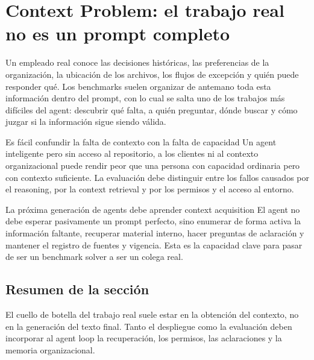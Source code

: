 \section{Context Problem: el trabajo real no es un prompt completo}



Un empleado real conoce las decisiones históricas, las preferencias de la organización, la ubicación de los archivos, los flujos de excepción y quién puede responder qué. Los benchmarks suelen organizar de antemano toda esta información dentro del prompt, con lo cual se salta uno de los trabajos más difíciles del agent: descubrir qué falta, a quién preguntar, dónde buscar y cómo juzgar si la información sigue siendo válida.

\begin{warningbox}{Es fácil confundir la falta de contexto con la falta de capacidad}
Un agent inteligente pero sin acceso al repositorio, a los clientes ni al contexto organizacional puede rendir peor que una persona con capacidad ordinaria pero con contexto suficiente. La evaluación debe distinguir entre los fallos causados por el reasoning, por la context retrieval y por los permisos y el acceso al entorno.
\end{warningbox}

\begin{importantbox}{La próxima generación de agents debe aprender context acquisition}
El agent no debe esperar pasivamente un prompt perfecto, sino enumerar de forma activa la información faltante, recuperar material interno, hacer preguntas de aclaración y mantener el registro de fuentes y vigencia. Esta es la capacidad clave para pasar de ser un benchmark solver a ser un colega real.
\end{importantbox}


\subsection{Resumen de la sección}

El cuello de botella del trabajo real suele estar en la obtención del contexto, no en la generación del texto final. Tanto el despliegue como la evaluación deben incorporar al agent loop la recuperación, los permisos, las aclaraciones y la memoria organizacional.

